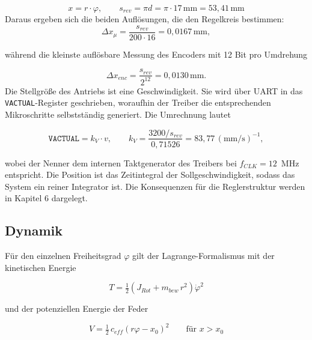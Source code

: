 \begin{equation}
    x = r \cdot \varphi ,
    \qquad
    s_{rev} = \pi d = \pi \cdot 17\,\mathrm{mm} = 53,41\,\mathrm{mm}
    \label{eq:kinematik}
\end{equation}
Daraus ergeben sich die beiden Auflösungen, die den Regelkreis bestimmen:
\begin{equation}
    \Delta x_{\mu} = \frac{s_{rev}}{200 \cdot 16} = 0,0167\,\mathrm{mm} ,
    \label{eq:aufloesung_aktor}
\end{equation}

während die kleinste auflösbare Messung des Encoders mit 12 Bit pro
Umdrehung

\begin{equation}
    \Delta x_{enc} = \frac{s_{rev}}{2^{12}} = 0,0130\,\mathrm{mm} .
    \label{eq:aufloesung_encoder}
\end{equation}
Die Stellgröße des Antriebs ist eine Geschwindigkeit. Sie wird über UART in das
\texttt{VACTUAL}-Register geschrieben, woraufhin der Treiber die
entsprechenden Mikroschritte selbstständig generiert. Die Umrechnung lautet

\begin{equation}
    \texttt{VACTUAL} = k_V \cdot v ,
    \qquad
    k_V = \frac{3200 / s_{rev}}{0,71526} = 83,77\,\mathrm{(mm/s)^{-1}} ,
    \label{eq:vactual}
\end{equation}

wobei der Nenner dem internen Taktgenerator des Treibers
bei $f_{CLK} = 12$~MHz entspricht. Die Position ist das Zeitintegral der Sollgeschwindigkeit,
sodass das System ein reiner Integrator ist. Die Konsequenzen für die Reglerstruktur
werden in Kapitel 6 dargelegt.

\subsection*{Dynamik}

Für den einzelnen Freiheitsgrad $\varphi$ gilt der Lagrange-Formalismus mit der
kinetischen Energie

\begin{equation}
    T = \tfrac{1}{2}\left(J_{Rot} + m_{bew}\,r^2\right)\dot{\varphi}^2
    \label{eq:kinetische_energie}
\end{equation}

und der potenziellen Energie der Feder

\begin{equation}
    V = \tfrac{1}{2}\,c_{eff}\left(r\varphi - x_0\right)^2
    \qquad \text{für } x > x_0
    \label{eq:potentielle_energie}
\end{equation}

